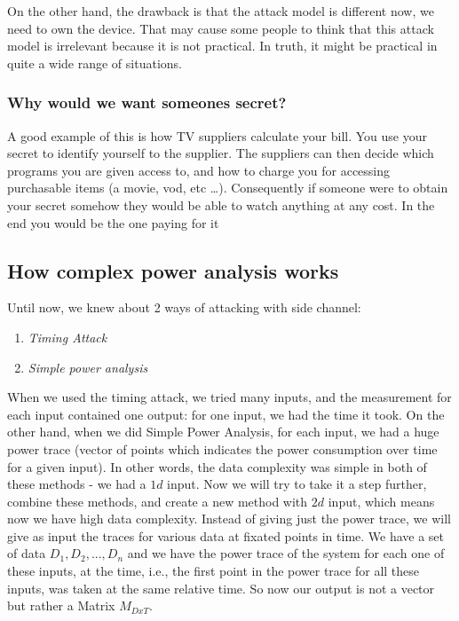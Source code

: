 On the other hand, the drawback is that the attack model is different now, we need to own the device. 
That may cause some people to think that this attack model is irrelevant because it is not practical. 
In truth, it might be practical in quite a wide range of situations.


\subsubsection{Why would we want someones secret?}

A good example of this is how TV suppliers calculate your bill.
You use your secret to identify yourself to the supplier. The suppliers can then decide which programs you are given access to, and how to charge you for accessing purchasable items (a movie, vod, etc \ldots). 
Consequently if someone were to obtain your secret somehow they would be able to watch anything at any cost. In the end you would be the one paying for it

\subsection{How complex power analysis works}

Until now, we knew about 2 ways of attacking with side channel:
\begin{enumerate}
    \item \textit{Timing Attack}
    \item \textit{Simple power analysis}
\end{enumerate}

When we used the timing attack, we tried many inputs, and the measurement for each input contained one output: for one input, we had the time it took. 
On the other hand, when we did Simple Power Analysis, for each input, we had a huge power trace (vector of points which indicates the power consumption over time for a given input). 
In other words, the data complexity was simple in both of these
methods - we had a $1d$ input. 
Now we will try to take it a step further, combine these methods, and create a new method with $2d$ input, which means now we have high data complexity. 
Instead of giving just the power trace, we will give as input the traces for various data at fixated points in time. 
We have a set of data ${D_1, D_2, ..., D_n}$ and we have the power trace of the system for each one of these inputs, at the time, i.e., the first point in the power trace for all these inputs, was taken at the same relative time. 
So now our output is not a vector but rather a Matrix $M_{DxT}$.

